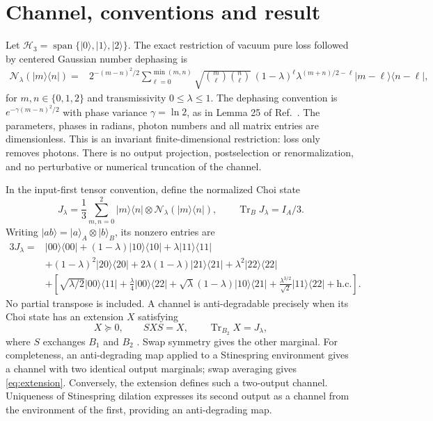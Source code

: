 \documentclass[11pt]{article}
\newcommand{\ket}[1]{\lvert #1\rangle}
\newcommand{\bra}[1]{\langle #1\rvert}
\newcommand{\Tr}{\operatorname{Tr}}
\newcommand{\N}{\mathcal N}
\begin{document}
\section{Channel, conventions and result}
Let $\mathcal H_3=\operatorname{span}\{\ket0,\ket1,\ket2\}$. The exact
restriction of vacuum pure loss followed by centered Gaussian number
dephasing is
\begin{equation}\label{eq:channel}
\begin{split}
\N_\lambda(\ket m\bra n)
={}&2^{-(m-n)^2/2}\sum_{\ell=0}^{\min(m,n)}
\sqrt{\binom m\ell\binom n\ell}\,(1-\lambda)^\ell
\lambda^{(m+n)/2-\ell}\ket{m-\ell}\bra{n-\ell},
\end{split}
\end{equation}
for $m,n\in\{0,1,2\}$ and transmissivity $0\leq\lambda\leq1$.
The dephasing convention is $e^{-\gamma(m-n)^2/2}$ with phase variance
$\gamma=\ln2$, as in Lemma 25 of Ref.~\cite{Mele2024}. The parameters,
phases in radians, photon numbers and all matrix entries are dimensionless.
This is an invariant finite-dimensional restriction: loss only removes
photons. There is no output projection, postselection or renormalization,
and no perturbative or numerical truncation of the channel.

In the input-first tensor convention, define the normalized Choi state
\begin{equation}\label{eq:choi}
J_\lambda=\frac13\sum_{m,n=0}^2\ket m\bra n\otimes
\N_\lambda(\ket m\bra n),\qquad \Tr_BJ_\lambda=I_A/3.
\end{equation}
Writing $\ket{ab}=\ket a_A\otimes\ket b_B$, its nonzero entries are
\begin{equation}\label{eq:choi-entries}
\begin{split}
3J_\lambda={}&\ket{00}\bra{00}+(1-\lambda)\ket{10}\bra{10}
+\lambda\ket{11}\bra{11}\phantom{\Big|}\\
&+(1-\lambda)^2\ket{20}\bra{20}
+2\lambda(1-\lambda)\ket{21}\bra{21}
+\lambda^2\ket{22}\bra{22}\\
&+\left[\sqrt{\lambda/2}\ket{00}\bra{11}
+\frac\lambda4\ket{00}\bra{22}
+\sqrt\lambda(1-\lambda)\ket{10}\bra{21}
+\frac{\lambda^{3/2}}{\sqrt2}\ket{11}\bra{22}
+\mathrm{h.c.}\right].
\end{split}
\end{equation}
No partial transpose is included. A channel is anti-degradable precisely
when its Choi state has an extension $X$ satisfying
\begin{equation}\label{eq:extension}
X\succeq0,\qquad SX S=X,\qquad \Tr_{B_2}X=J_\lambda,
\end{equation}
where $S$ exchanges $B_1$ and $B_2$ \cite{Mele2024,Myhr2009}.
Swap symmetry gives the other marginal. For completeness, an anti-degrading
map applied to a Stinespring environment gives a channel with two identical
output marginals; swap averaging gives \eqref{eq:extension}. Conversely,
the extension defines such a two-output channel. Uniqueness of Stinespring
dilation expresses its second output as a channel from the environment
of the first, providing an anti-degrading map.
\end{document}
